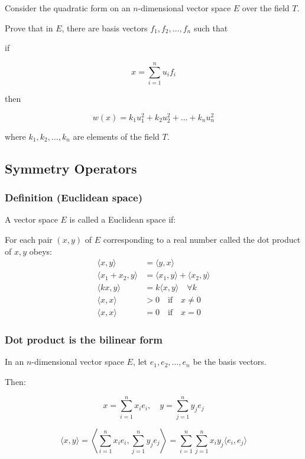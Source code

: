 Consider the quadratic form on an $n$-dimensional vector space $E$ over the field $T$.

Prove that in $E$, there are basis vectors $f_1, f_2, \ldots, f_n$ such that

if

\[
x = \sum_{i=1}^n u_i f_i
\]

then

\[
w(x) = k_1 u_1^2 + k_2 u_2^2 + \ldots + k_n u_n^2
\]

where $k_1, k_2, \ldots, k_n$ are elements of the field $T$.




\subsection{Symmetry Operators}

\subsubsection{Definition (Euclidean space)}

A vector space $E$ is called a Euclidean space if:

For each pair $(x, y)$ of $E$ corresponding to a real number called the dot product of $x, y$ obeys:
\begin{align*}
    \langle x, y \rangle &= \langle y, x \rangle\\
    \langle x_1 + x_2, y \rangle &= \langle x_1, y \rangle + \langle x_2, y \rangle\\
    \langle kx, y \rangle &= k \langle x, y \rangle \quad \forall k\\
    \langle x, x \rangle &> 0 \quad \text{if} \quad x \neq 0\\
    \langle x, x \rangle &= 0 \quad \text{if} \quad x = 0
\end{align*}

\subsubsection{Dot product is the bilinear form}

In an $n$-dimensional vector space $E$, let $e_1, e_2, \ldots, e_n$ be the basis vectors.

Then:

\[
x = \sum_{i=1}^n x_i e_i, \quad y = \sum_{j=1}^n y_j e_j
\]

\[
\langle x, y \rangle = \left\langle \sum_{i=1}^n x_i e_i, \sum_{j=1}^n y_j e_j \right\rangle = \sum_{i=1}^n \sum_{j=1}^n x_i y_j \langle e_i, e_j \rangle
\]

